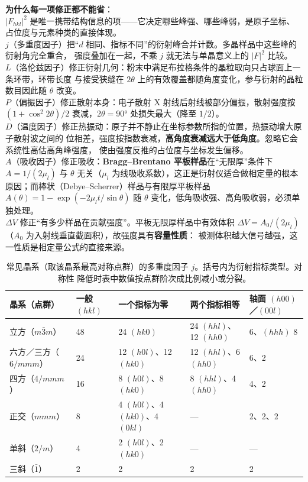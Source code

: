 \begin{keycond}
\textbf{为什么每一项修正都不能省}：\\
$\left|F_{hkl}\right|^{2}$ 是唯一携带结构信息的项——它决定哪些峰强、哪些峰弱，是原子坐标、
占位度与元素种类的直接体现。\\
$j$（多重度因子）把“$d$ 相同、指标不同”的衍射峰合并计数。多晶样品中这些峰的衍射角完全重合，
强度叠加在一起，不乘 $j$ 就无法与单晶意义上的 $|F|^{2}$ 比较。\\
$L$（洛伦兹因子）修正衍射几何：粉末中满足布拉格条件的晶粒取向只占球面上一条环带，环带长度
与接受狭缝在 $2\theta$ 上的有效覆盖都随角度变化，参与衍射的晶粒数目因此随 $\theta$ 改变。\\
$P$（偏振因子）修正散射本身：电子散射 X 射线后射线被部分偏振，散射强度按
$(1+\cos^{2}2\theta)/2$ 衰减，$2\theta=90°$ 处损失最大（降至 $1/2$）。\\
$D$（温度因子）修正热振动：原子并不静止在坐标参数所指的位置，热振动增大原子散射波之间的
位相差，强度按指数衰减，\textbf{高角度衰减远大于低角度}。忽略它会系统性高估高角峰强度，
使由强度反推的占位度与坐标发生偏移。\\
$A$（吸收因子）修正吸收：\textbf{Bragg--Brentano 平板样品}在“无限厚”条件下
$A=1/(2\mu_{l})$ 与 $\theta$ 无关（$\mu_{l}$ 为线吸收系数），这正是衍射仪适合做相定量的根本
原因；而棒状（Debye--Scherrer）样品与有限厚平板样品 $A(\theta)=1-\exp(-2\mu_{l}t/\sin\theta)$
随 $\theta$ 变化，低角吸收强、高角吸收弱，必须单独处理。\\
$\Delta V$ 修正“有多少样品在贡献强度”。平板无限厚样品中有效体积
$\Delta V=A_{0}/(2\mu_{l})$（$A_{0}$ 为入射线垂直截面积），故强度具有\textbf{容量性质}：
被测体积越大信号越强，这一性质是相定量公式的直接来源。
\end{keycond}

\begin{table}[tbp]
  \centering
  \caption{常见晶系（取该晶系最高对称点群）的多重度因子 $j$。括号内为衍射指标类型。对称性
    降低时表中数值按点群阶次成比例减小或分裂。}
  \label{tab:ch04b-multiplicity}
  \begin{tabular}{@{}lllll@{}}
    \toprule
    晶系（点群） & 一般 $(hkl)$ & 一个指标为零 & 两个指标相等 & 轴面 $(h00)$／$(00l)$ \\
    \midrule
    立方（$m\bar{3}m$） & 48 & 24 $(hk0)$ & 24 $(hhl)$、12 $(hh0)$ & 6、$(hhh)$ 8 \\
    六方／三方（$6/mmm$） & 24 & 12 $(h0l)$、12 $(hk0)$ & 12 $(hhl)$、6 $(hh0)$ & 6、2 \\
    四方（$4/mmm$） & 16 & 8 $(h0l)$、8 $(hk0)$ & 8 $(hhl)$、4 $(hh0)$ & 4、2 \\
    正交（$mmm$） & 8 & 4 $(h0l)$、4 $(hk0)$、4 $(0kl)$ & --- & 2、2、2 \\
    单斜（$2/m$） & 4 & 2 $(h0l)$、2 $(hk0)$ & --- & --- \\
    三斜（$\bar{1}$） & 2 & 2 & 2 & 2 \\
    \bottomrule
  \end{tabular}
\end{table}

